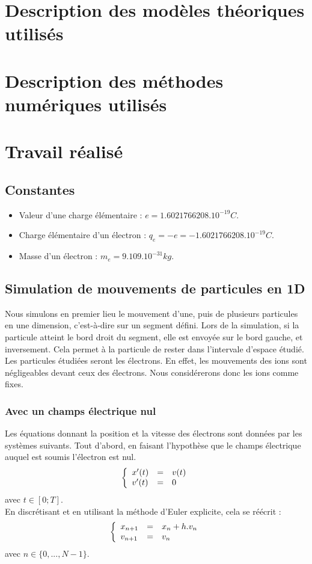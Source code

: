 \documentclass{article}
\begin{document}
\section{Description des modèles théoriques utilisés}
\section{Description des méthodes numériques utilisés}
\section{Travail réalisé}
\subsection*{Constantes}
\begin{itemize}
\item Valeur d'une charge élémentaire : $e = 1.6021766208.10^{-19} C$.
\item Charge élémentaire d'un électron : $q_e = -e = -1.6021766208.10^{-19} C$.
\item Masse d'un électron : $m_e = 9.109.10^{-31} kg$.
\end{itemize}
\subsection*{Simulation de mouvements de particules en 1D}
Nous simulons en premier lieu le mouvement d'une, puis de plusieurs particules en une dimension, c'est-à-dire sur un segment défini. Lors de la simulation, si la particule atteint le bord droit du segment, elle est envoyée sur le bord gauche, et inversement. Cela permet à la particule de rester dans l'intervale d'espace étudié. Les particules étudiées seront les électrons. En effet, les mouvements des ions sont négligeables devant ceux des électrons. Nous considérerons donc les ions comme fixes.
\subsubsection*{Avec un champs électrique nul}
Les équations donnant la position et la vitesse des électrons sont données par les systèmes suivants. Tout d'abord, en faisant l'hypothèse que le champs électrique auquel est soumis l'électron est nul.
$$
\left \{
   \begin{array}{l l l}
      x'(t)  & = & v(t) \\
      v'(t)  & = & 0 \\
	\end{array}
\right.
$$
avec $t \in [0;T]$.\\
En discrétisant et en utilisant la méthode d'Euler explicite, cela se réécrit :
$$
\left \{
   \begin{array}{l l l}
      x_{n+1}  & = & x_n + h.v_n \\
      v_{n+1}  & = & v_n \\
	\end{array}
\right.
$$
avec $n \in \{0,...,N-1\}$.\\
\end{document}
